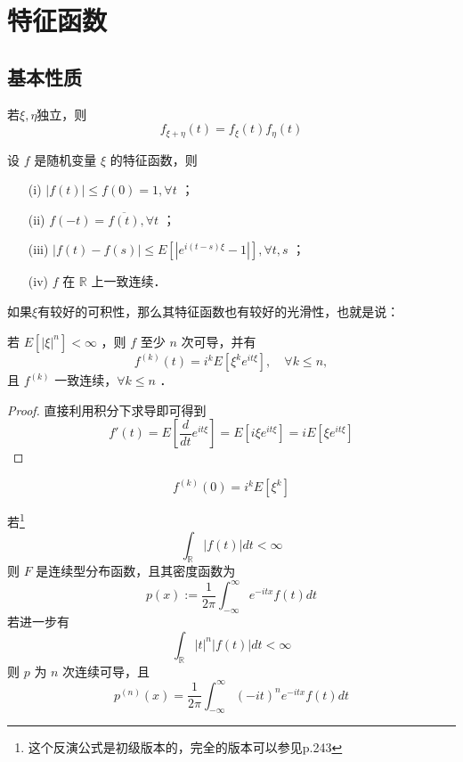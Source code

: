 \section{特征函数}

\subsection{基本性质}
\begin{proposition}
    若$\xi,\eta$独立，则
    \[
        f_{\xi+\eta}(t)=f_{\xi}(t) f_\eta(t)
    \]
\end{proposition}
\begin{theorem}
    设 $f$ 是随机变量 $\xi$ 的特征函数，则
    \begin{enumerate}
        \item[(i)] $|f(t)| \leqslant f(0)=1, \forall t$ ；
        \item[(ii)] $f(-t)=\overline{f(t)}, \forall t$ ；
        \item[(iii)] $|f(t)-f(s)| \leqslant E\left[\left|e^{i(t-s) \xi}-1\right|\right], \forall t, s$ ；
        \item[(iv)] $f$ 在 $\mathbb{R}$ 上一致连续．
    \end{enumerate}
\end{theorem}
如果$\xi$有较好的可积性，那么其特征函数也有较好的光滑性，也就是说：
\begin{theorem}\label{theorem:特征函数可导性1}
    若 $E\left[|\xi|^n\right]<\infty$ ，则 $f$ 至少 $n$ 次可导，并有
    $$
        f^{(k)}(t)=i^k E\left[\xi^k e^{i t \xi}\right], \quad \forall k \leqslant n,
    $$
    且 $f^{(k)}$ 一致连续，$\forall k \leqslant n$ ．
\end{theorem}
\begin{proof}
    直接利用积分下求导即可得到
    \[
        f'(t)=E[\frac{d}{dt}e^{it\xi}]=E[i\xi e^{it\xi}]=iE[\xi e^{it\xi}]
    \]
\end{proof}
\begin{corollary}
    \[
        f^{(k)}(0)=i^k E[\xi^k]
    \]
\end{corollary}
\begin{theorem}[反演公式]\label{theorem:inverse_formula}
    若\footnote{这个反演公式是初级版本的，完全的版本可以参见\cite{任佳刚}p.243}
    $$
        \int_{\mathbb{R}}|f(t)| d t<\infty
    $$
    则 $F$ 是连续型分布函数，且其密度函数为
    $$
        p(x):=\frac{1}{2 \pi} \int_{-\infty}^{\infty} e^{-i t x} f(t) d t
    $$
    若进一步有
    $$
        \int_{\mathbb{R}}|t|^n|f(t)| d t<\infty
    $$
    则 $p$ 为 $n$ 次连续可导，且
    $$
        p^{(n)}(x)=\frac{1}{2 \pi} \int_{-\infty}^{\infty}(-i t)^n e^{-i t x} f(t) d t
    $$
\end{theorem}



